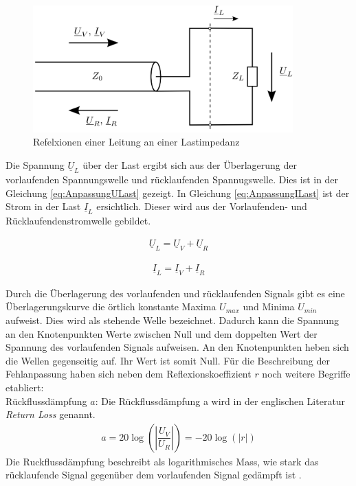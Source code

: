 \begin{figure}[h]
	\centering
	\includegraphics[width=10cm]{content/bilder/ReflexionenLeitungLastimpedanz.pdf}%
	\caption{Refelxionen einer Leitung an einer Lastimpedanz \cite{Tekom}}
	\label{FitzDipol}
\end{figure}


Die Spannung $\underline{U}_L$ über der Last ergibt sich  aus der Überlagerung der vorlaufenden Spannungswelle und  rücklaufenden Spannugswelle. Dies ist in der Gleichung \ref{eq:AnpassungULast} gezeigt. In Gleichung \ref{eq:AnpassungILast} ist der Strom in der Last $\underline{I}_L$ ersichtlich. Dieser wird aus der Vorlaufenden- und Rücklaufendenstromwelle gebildet\cite{Tekom}.


\begin{eqnarray}\label{eq:AnpassungULast}
\underline{U}_L = \underline{U}_V + \underline{U}_R
\end{eqnarray}

\begin{eqnarray}\label{eq:AnpassungILast}
\underline{I}_L = \underline{I}_V + \underline{I}_R
\end{eqnarray}

Durch die Überlagerung des vorlaufenden und rücklaufenden Signals gibt es eine Überlagerungskurve die örtlich konstante Maxima $U_{max}$ und Minima $U_{min}$ aufweist. Dies wird als stehende Welle bezeichnet. Dadurch kann die Spannung an den Knotenpunkten Werte zwischen Null und dem doppelten Wert der Spannung des vorlaufenden Signals aufweisen. An den Knotenpunkten heben sich die Wellen gegenseitig auf. Ihr Wert ist somit Null. Für die Beschreibung der Fehlanpassung haben sich neben dem Reflexionskoeffizient  $r$ noch weitere Begriffe etabliert: \\

Rückflussdämpfung $a$:
Die Rückflussdämpfung a wird in der englischen Literatur \textit{Return Loss} genannt.
\begin{eqnarray}\label{eq:Ruckflussdämpfung_a}
a=20\log\left(\left| \dfrac{U_V}{U_R}\right| \right)=-20\log(|r|)
\end{eqnarray}
Die Ruckflussdämpfung beschreibt als logarithmisches Mass, wie stark das rücklaufende Signal gegenüber dem vorlaufenden Signal gedämpft ist \cite{Tekom}.\\

